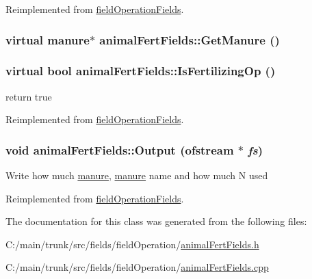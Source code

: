 Reimplemented from \hyperlink{classfield_operation_fields_a0b7b1a0da8d7bbc651bf9256fc3eef9f}{fieldOperationFields}.\hypertarget{classanimal_fert_fields_ab175469d12d422d2f96d60374b96402c}{
\subsubsection[{GetManure}]{\setlength{\rightskip}{0pt plus 5cm}virtual {\bf manure}$\ast$ animalFertFields::GetManure ()}}
\label{classanimal_fert_fields_ab175469d12d422d2f96d60374b96402c}
\hypertarget{classanimal_fert_fields_a793fca221cb66cef70bbfcb1cf124680}{
\subsubsection[{IsFertilizingOp}]{\setlength{\rightskip}{0pt plus 5cm}virtual bool animalFertFields::IsFertilizingOp ()}}
\label{classanimal_fert_fields_a793fca221cb66cef70bbfcb1cf124680}


return true 

Reimplemented from \hyperlink{classfield_operation_fields_ae21a07b4ab147829465e5b79418708f7}{fieldOperationFields}.\hypertarget{classanimal_fert_fields_a486ecb469147fbfd89dc4461c202ca36}{
\subsubsection[{Output}]{\setlength{\rightskip}{0pt plus 5cm}void animalFertFields::Output (ofstream $\ast$ {\em fs})}}
\label{classanimal_fert_fields_a486ecb469147fbfd89dc4461c202ca36}
Write how much \hyperlink{classmanure}{manure}, \hyperlink{classmanure}{manure} name and how much N used 

Reimplemented from \hyperlink{classfield_operation_fields_a8dff595b832bca540dda946639f7f47a}{fieldOperationFields}.

The documentation for this class was generated from the following files:\begin{DoxyCompactItemize}
\item 
C:/main/trunk/src/fields/fieldOperation/\hyperlink{animal_fert_fields_8h}{animalFertFields.h}\item 
C:/main/trunk/src/fields/fieldOperation/\hyperlink{animal_fert_fields_8cpp}{animalFertFields.cpp}\end{DoxyCompactItemize}
